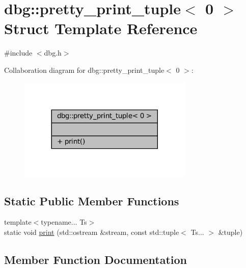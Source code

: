 \hypertarget{structdbg_1_1pretty__print__tuple_3_010_01_4}{}\section{dbg\+:\+:pretty\+\_\+print\+\_\+tuple$<$ 0 $>$ Struct Template Reference}
\label{structdbg_1_1pretty__print__tuple_3_010_01_4}


{\ttfamily \#include $<$dbg.\+h$>$}



Collaboration diagram for dbg\+:\+:pretty\+\_\+print\+\_\+tuple$<$ 0 $>$\+:
\nopagebreak
\begin{figure}[H]
\begin{center}
\leavevmode
\includegraphics[width=236pt]{structdbg_1_1pretty__print__tuple_3_010_01_4__coll__graph}
\end{center}
\end{figure}
\subsection*{Static Public Member Functions}
\begin{DoxyCompactItemize}
\item 
{\footnotesize template$<$typename... Ts$>$ }\\static void \hyperlink{structdbg_1_1pretty__print__tuple_3_010_01_4_a9961147d35a3bcc6b89af9610c68ad39}{print} (std\+::ostream \&stream, const std\+::tuple$<$ Ts... $>$ \&tuple)
\end{DoxyCompactItemize}


\subsection{Member Function Documentation}
\mbox{\label{structdbg_1_1pretty__print__tuple_3_010_01_4_a9961147d35a3bcc6b89af9610c68ad39}} 
